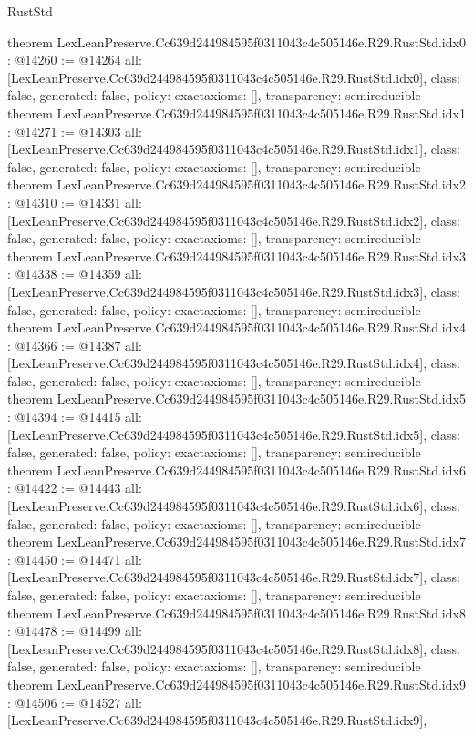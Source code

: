 \begin{lexlean}{RustStd}
\begin{coremodule}
{}
theorem LexLeanPreserve.Cc639d244984595f0311043c4c505146e.R29.RustStd.idx0 : @14260 := @14264 {
  all: [LexLeanPreserve.Cc639d244984595f0311043c4c505146e.R29.RustStd.idx0],
  class: false,
  generated: false,
  policy: exact{axioms: []},
  transparency: semireducible
}
theorem LexLeanPreserve.Cc639d244984595f0311043c4c505146e.R29.RustStd.idx1 : @14271 := @14303 {
  all: [LexLeanPreserve.Cc639d244984595f0311043c4c505146e.R29.RustStd.idx1],
  class: false,
  generated: false,
  policy: exact{axioms: []},
  transparency: semireducible
}
theorem LexLeanPreserve.Cc639d244984595f0311043c4c505146e.R29.RustStd.idx2 : @14310 := @14331 {
  all: [LexLeanPreserve.Cc639d244984595f0311043c4c505146e.R29.RustStd.idx2],
  class: false,
  generated: false,
  policy: exact{axioms: []},
  transparency: semireducible
}
theorem LexLeanPreserve.Cc639d244984595f0311043c4c505146e.R29.RustStd.idx3 : @14338 := @14359 {
  all: [LexLeanPreserve.Cc639d244984595f0311043c4c505146e.R29.RustStd.idx3],
  class: false,
  generated: false,
  policy: exact{axioms: []},
  transparency: semireducible
}
theorem LexLeanPreserve.Cc639d244984595f0311043c4c505146e.R29.RustStd.idx4 : @14366 := @14387 {
  all: [LexLeanPreserve.Cc639d244984595f0311043c4c505146e.R29.RustStd.idx4],
  class: false,
  generated: false,
  policy: exact{axioms: []},
  transparency: semireducible
}
theorem LexLeanPreserve.Cc639d244984595f0311043c4c505146e.R29.RustStd.idx5 : @14394 := @14415 {
  all: [LexLeanPreserve.Cc639d244984595f0311043c4c505146e.R29.RustStd.idx5],
  class: false,
  generated: false,
  policy: exact{axioms: []},
  transparency: semireducible
}
theorem LexLeanPreserve.Cc639d244984595f0311043c4c505146e.R29.RustStd.idx6 : @14422 := @14443 {
  all: [LexLeanPreserve.Cc639d244984595f0311043c4c505146e.R29.RustStd.idx6],
  class: false,
  generated: false,
  policy: exact{axioms: []},
  transparency: semireducible
}
theorem LexLeanPreserve.Cc639d244984595f0311043c4c505146e.R29.RustStd.idx7 : @14450 := @14471 {
  all: [LexLeanPreserve.Cc639d244984595f0311043c4c505146e.R29.RustStd.idx7],
  class: false,
  generated: false,
  policy: exact{axioms: []},
  transparency: semireducible
}
theorem LexLeanPreserve.Cc639d244984595f0311043c4c505146e.R29.RustStd.idx8 : @14478 := @14499 {
  all: [LexLeanPreserve.Cc639d244984595f0311043c4c505146e.R29.RustStd.idx8],
  class: false,
  generated: false,
  policy: exact{axioms: []},
  transparency: semireducible
}
theorem LexLeanPreserve.Cc639d244984595f0311043c4c505146e.R29.RustStd.idx9 : @14506 := @14527 {
  all: [LexLeanPreserve.Cc639d244984595f0311043c4c505146e.R29.RustStd.idx9],
}
\end{coremodule}
\end{lexlean}
